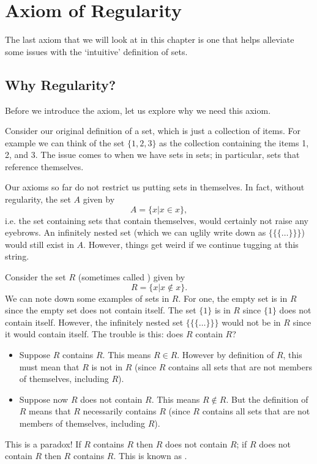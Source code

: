 
\section{Axiom of Regularity}  %
The last axiom that we will look at in this chapter is one that helps alleviate some issues with the `intuitive' definition of sets.

\subsection{Why Regularity?}
Before we introduce the axiom, let us explore why we need this axiom.

Consider our original definition of a set, which is just a collection of items. For example we can think of the set $\{1, 2, 3\}$ as the collection containing the items 1, 2, and 3. The issue comes to when we have sets in sets; in particular, sets that reference themselves.

Our axioms so far do not restrict us putting sets in themselves. In fact, without regularity, the set $A$ given by
\[
    A = \{x \vert x \in x\},
\]
i.e. the set containing sets that contain themselves, would certainly not raise any eyebrows. An infinitely nested set (which we can uglily write down as $\{\{\{\dots\}\}\}$) would still exist in $A$. However, things get weird if we continue tugging at this string.

Consider the set $R$ (sometimes called ) given by
\[
    R = \{x \vert x \notin x\}.
\]
We can note down some examples of sets in $R$. For one, the empty set is in $R$ since the empty set does not contain itself. The set $\{1\}$ is in $R$ since $\{1\}$ does not contain itself. However, the infinitely nested set $\{\{\{\dots\}\}\}$ would not be in $R$ since it would contain itself. The trouble is this: does $R$ contain $R$?
\begin{itemize}
    \item Suppose $R$ contains $R$. This means $R \in R$. However by definition of $R$, this must mean that $R$ is not in $R$ (since $R$ contains all sets that are not members of themselves, including $R$).
    \item Suppose now $R$ does not contain $R$. This means $R \notin R$. But the definition of $R$ means that $R$ necessarily contains $R$ (since $R$ contains all sets that are not members of themselves, including $R$).
\end{itemize}
This is a paradox! If $R$ contains $R$ then $R$ does not contain $R$; if $R$ does not contain $R$ then $R$ contains $R$. This is known as .

